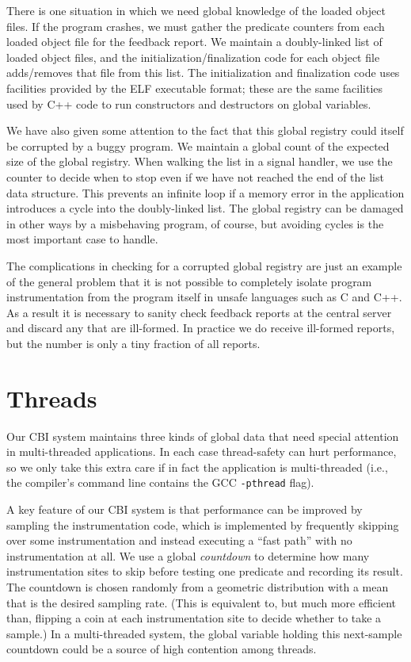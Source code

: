 \documentclass[10pt,twocolumn]{article}
\begin{document}
There is one situation in which we need global knowledge of the loaded
object files.  If the program crashes, we must gather
the predicate counters from each loaded object file for the feedback report.
We maintain a doubly-linked list of loaded object files, and the
initialization/finalization code for each object file adds/removes that
file from this list. The initialization and finalization code uses
facilities provided by the ELF executable format; these are the same
facilities used by C++ code to run constructors and destructors on
global variables.

We have also given some attention to the fact that this global
registry could itself be corrupted by a buggy program.  We maintain a
global count of the expected size of the global registry.  When
walking the list in a signal handler, we use the counter to decide
when to stop even if we have not reached the end of the list data
structure.  This prevents an infinite loop if a memory error in the
application introduces a cycle into the doubly-linked list.  The
global registry can be damaged in other ways by a misbehaving program,
of course, but avoiding cycles is the most important case to handle.

The complications in checking for a corrupted global registry are just
an example of the general problem that it is not possible to
completely isolate program instrumentation from the program itself in
unsafe languages such as C and C++.  As a result it is necessary to
sanity check feedback reports at the central server and discard any
that are ill-formed.  In practice we do receive ill-formed reports,
but the number is only a tiny fraction of all reports.

\section{Threads}

Our CBI system maintains three kinds of global data that 
need special attention in multi-threaded
applications.  In each case thread-safety can hurt performance, 
so we only take this extra care if in fact the application is multi-threaded
(i.e., the compiler's command line contains the GCC \texttt{-pthread} flag).

A key feature of our CBI system is that performance can be improved by
sampling the instrumentation code, which is implemented by frequently
skipping over some instrumentation and instead executing a ``fast
path'' with no instrumentation at all.  We use a global
\emph{countdown} to determine how many instrumentation sites to skip
before testing one predicate and recording its result.  The countdown
is chosen randomly from a geometric distribution with a mean that is
the desired sampling rate.  (This is equivalent to, but much more
efficient than, flipping a coin at each instrumentation site to decide
whether to take a sample.)  In a multi-threaded system, the global
variable holding this next-sample countdown could be a source of high
contention among threads.
\end{document}
